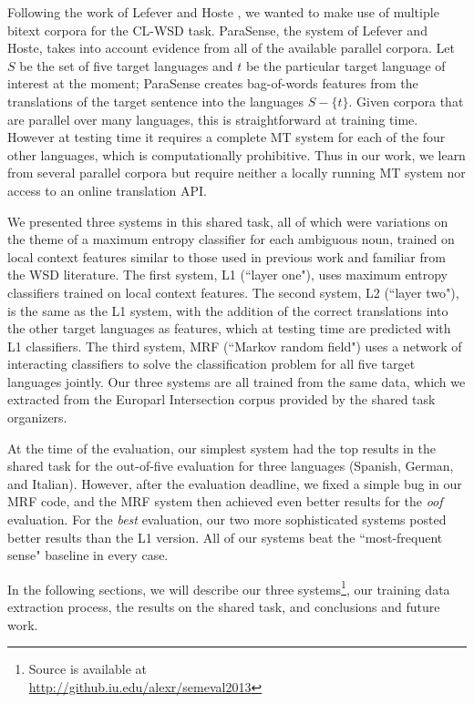 \documentclass[11pt,letterpaper]{article}
\begin{document}
Following the work of Lefever and Hoste
, we wanted to make use of
multiple bitext corpora for the CL-WSD task. ParaSense, the system of Lefever
and Hoste, takes into account evidence from all of the available parallel
corpora. Let $S$ be the set of five target languages and $t$ be the particular
target language of interest at the moment; ParaSense creates bag-of-words
features from the translations of the target sentence into the languages $S -
\lbrace{t \rbrace}$. Given corpora that are parallel over many languages, this
is straightforward at training time. However at testing time it requires a
complete MT system for each of the four other languages, which is
computationally prohibitive. Thus in our work, we learn from several parallel
corpora but require neither a locally running MT system nor access to an online
translation API.

We presented three systems in this shared task, all of which were variations on
the theme of a maximum entropy classifier for each ambiguous noun, trained on
local context features similar to those used in previous work and familiar from
the WSD literature. The first system, L1 (``layer one"), uses maximum entropy
classifiers trained on local context features. The second system, L2 (``layer
two"), is the same as the L1 system, with the addition of the correct
translations into the other target languages as features, which at testing time
are predicted with L1 classifiers. The third system, MRF (``Markov random
field") uses a network of interacting classifiers to solve the classification
problem for all five target languages jointly. Our three systems are all
trained from the same data, which we extracted from the Europarl Intersection
corpus provided by the shared task organizers.

At the time of the evaluation, our simplest system had the top results in the
shared task for the out-of-five evaluation for three languages (Spanish,
German, and Italian).  However, after the evaluation deadline, we fixed a
simple bug in our MRF code, and the MRF system then achieved even better
results for the \emph{oof} evaluation. For the \emph{best} evaluation, our two
more sophisticated systems posted better results than the L1 version. All of
our systems beat the ``most-frequent sense" baseline in every case.

In the following sections, we will describe our three
systems\footnote{Source is available at \\
\url{http://github.iu.edu/alexr/semeval2013}}, our training data extraction
process, the results on the shared task, and conclusions and future work.
\end{document}
